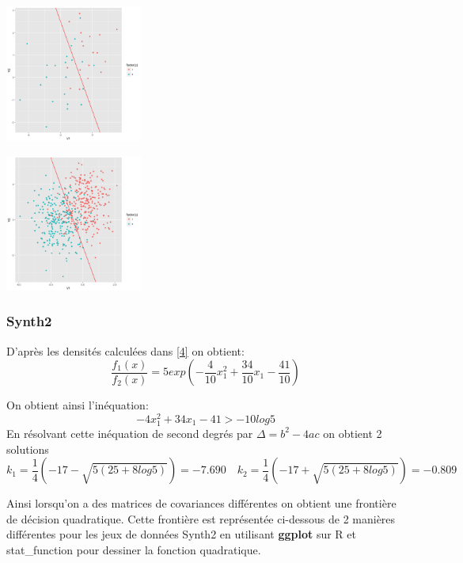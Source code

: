 \documentclass[10pt]{article}
\begin{document}
			\begin{minipage}{.5\textwidth}
	\includegraphics[width=45mm]{Figures/Exo2/linear_synth140.png}
	\label{fig:front_ceuc}
\end{minipage}%
\hspace{0.02\linewidth}
\begin{minipage}{.5\textwidth}
	\includegraphics[width=45mm]{Figures/Exo2/linear_synth1500.png}
	\label{fig:front_kppv}
\end{minipage}

\subsubsection{Synth2}
D'après les densités calculées dans \eqref{4} on obtient: \[\frac{f_{1}(x)}{f_{2}(x)} = 5exp(-\frac{4}{10}x_{1}^{2} + \frac{34}{10} x_{1} - \frac{41}{10})\]

On obtient ainsi l'inéquation: \[-4x_{1}^{2}  + 34x_{1} - 41 > -10log5\]
En résolvant cette inéquation de second degrés par $\Delta = b^{2} - 4ac$ on obtient 2 solutions
\[k_{1} = \frac{1}{4} (-17 - \sqrt{5 (25 + 8 log5)})= -7.690 \quad k_{2} = \frac{1}{4} (-17 +\sqrt{5 (25 + 8 log5)} ) = -0.809 \]

Ainsi lorsqu'on a des matrices de covariances différentes on obtient une frontière de décision quadratique. Cette frontière est représentée  ci-dessous de 2 manières différentes pour les jeux de données Synth2 en utilisant \textbf{ggplot\textit{}} sur R et stat\_function pour dessiner la fonction quadratique.\\
\end{document}
